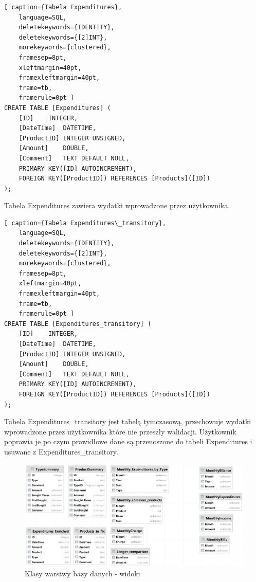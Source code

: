 \documentclass[a4paper,10pt, twoside]{report}
\begin{document}
\begin{minipage}{\textwidth}
\begin{lstlisting}[ caption={Tabela Expenditures},
    language=SQL,
    deletekeywords={IDENTITY},
    deletekeywords={[2]INT},
    morekeywords={clustered},
    framesep=8pt,
    xleftmargin=40pt,
    framexleftmargin=40pt,
    frame=tb,
    framerule=0pt ]
CREATE TABLE [Expenditures] (
	[ID]	INTEGER,
	[DateTime]	DATETIME,
	[ProductID]	INTEGER UNSIGNED,
	[Amount]	DOUBLE,
	[Comment]	TEXT DEFAULT NULL,
	PRIMARY KEY([ID] AUTOINCREMENT),
	FOREIGN KEY([ProductID]) REFERENCES [Products]([ID])
);
\end{lstlisting}
{Tabela Expenditures zawiera wydatki wprowadzone przez użytkownika.}
\end{minipage}

\begin{minipage}{\textwidth}
\begin{lstlisting}[ caption={Tabela Expenditures\_transitory},
    language=SQL,
    deletekeywords={IDENTITY},
    deletekeywords={[2]INT},
    morekeywords={clustered},
    framesep=8pt,
    xleftmargin=40pt,
    framexleftmargin=40pt,
    frame=tb,
    framerule=0pt ]
CREATE TABLE [Expenditures_transitory] (
	[ID]	INTEGER,
	[DateTime]	DATETIME,
	[ProductID]	INTEGER UNSIGNED,
	[Amount]	DOUBLE,
	[Comment]	TEXT DEFAULT NULL,
	PRIMARY KEY([ID] AUTOINCREMENT),
	FOREIGN KEY([ProductID]) REFERENCES [Products]([ID])
);
\end{lstlisting}
{Tabela Expenditures\_transitory jest tabelą tymczasową, przechowuje wydatki 
wprowadzone przez użytkownika które nie przeszły walidacji. Użytkownik poprawia 
je po czym prawidłowe dane są przenoszone do tabeli Expenditures i  usuwane z 
Expenditures\_transitory.}
\end{minipage}



\begin{figure}[H]           %
    \caption{Klasy warstwy bazy danych - widoki}
    \label{fig:Klasy warstwy bazy danych - widoki}
    \centering  
    \includegraphics[width=12cm]{figures/Righten_Finances-db_Views_DataGrid.png}
\end{figure}
\end{document}
